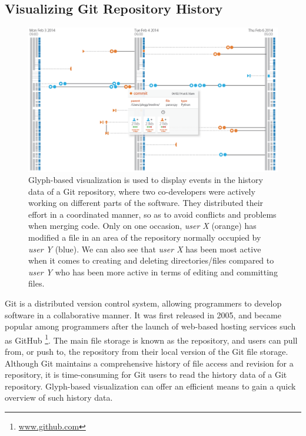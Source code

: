 \subsection{Visualizing Git Repository History}
%

\begin{figure}[ht!]
\begin{center}
\includegraphics[width=\textwidth]{images/filesystem/git-casestudy-2}
\end{center}
\caption{Glyph-based visualization is used to display events in the history data of a Git repository, where two co-developers were actively working on different parts of the software. They distributed their effort in a coordinated manner, so as to avoid conflicts and problems when merging code. Only on one occasion, \emph{user X} (orange) has modified a file in an area of the repository normally occupied by \emph{user Y} (blue). We can also see that \emph{user X} has been most active when it comes to creating and deleting directories/files compared to \emph{user Y} who has been more active in terms of editing and committing files.}
\label{fig:git}
\end{figure}

Git is a distributed version control system, allowing programmers to develop software in a collaborative manner.
It was first released in 2005, and became popular among programmers after the launch of web-based hosting services such as GitHub \footnote{\url{www.github.com}}.
The main file storage is known as the repository, and users can pull from, or push to, the repository from their local version of the Git file storage.
Although Git maintains a comprehensive history of file access and revision for a repository, it is time-consuming for Git users to read the history data of a Git repository.
Glyph-based visualization can offer an efficient means to gain a quick overview of such history data.

